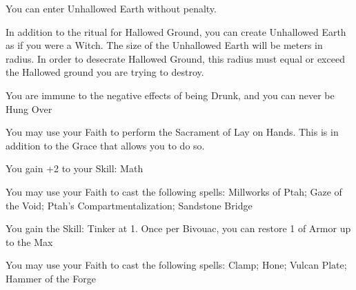 {\GOD[
Name=Nimlurun,
Link=small-god-nimlurun,
GodOf=Fiend of Filth and Pollution,
Holy=an iron vial of sewer water
]


You can enter Unhallowed Earth without penalty.


In addition to the ritual for Hallowed Ground, you can create Unhallowed Earth as if you were a Witch.  The size of the Unhallowed Earth will be \DICE meters in radius.  In order to desecrate Hallowed Ground, this radius must equal or exceed the Hallowed ground you are trying to destroy.




\GOD[
Name=Ninkasi,
Link=small-god-ninkasi,
GodOf=Seraph of Art; Music; and Fermentation,
Holy=an iron amulet hung from a necklace in the exact size and shape of a modern bottle opener
]


You are immune to the negative effects of being Drunk, and you can never be Hung Over


You may use your Faith to perform the Sacrament of Lay on Hands.  This is in addition to the Grace that allows you to do so.




\GOD[
Name=Ptah,
Link=small-god-ptah,
GodOf=God of Builders,
Holy=an amulet in the shape of an ankh
]


You gain +2 to your Skill: Math


You may use your Faith to cast the following spells: Millworks of Ptah; Gaze of the Void; Ptah's Compartmentalization; Sandstone Bridge







\GOD[
Name=Vulcan,
Link=small-god-vulcan,
GodOf=Seraph of the Forge,
Holy=a small crude homonculous hammered from iron
]


You gain the Skill: Tinker at 1.  Once per Bivouac, you can restore 1 \UD of Armor up to the Max 


You may use your Faith to cast the following spells: Clamp; Hone; Vulcan Plate; Hammer of the Forge

}
